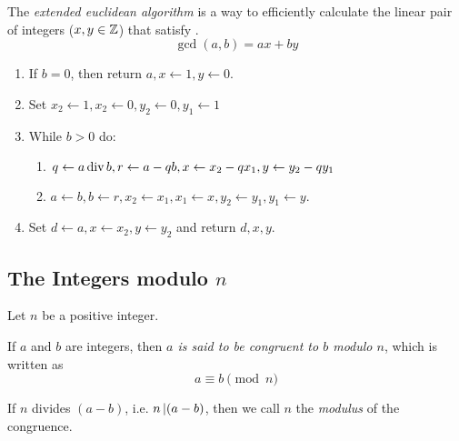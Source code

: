 \begin{definition}\label{def:Extended_Euclidean_Algorithm}
  The \emph{extended euclidean algorithm} is a way to efficiently calculate the linear pair of integers ($x, y \in \operatorname{\mathbb{Z}}$) that satisfy .
  \begin{equation*}
    \gcd(a, b) = ax + by
  \end{equation*}

  \begin{enumerate}[noitemsep]
  \item If $b = 0$, then return $a, x \leftarrow 1, y \leftarrow 0$.
  \item Set $x_{2} \leftarrow 1, x_{2} \leftarrow 0, y_{2} \leftarrow 0, y_{1} \leftarrow 1$
  \item While $b > 0$ do:
    \begin{enumerate}[noitemsep]
    \item $q \leftarrow a \operatorname{\text{div}} b, r \leftarrow a-qb, x \leftarrow x_{2} - qx_{1}, y \leftarrow y_{2} - qy_{1}$
    \item $a \leftarrow b, b \leftarrow r, x_{2} \leftarrow x_{1}, x_{1} \leftarrow x, y_{2} \leftarrow y_{1}, y_{1} \leftarrow y$.
    \end{enumerate}
  \item Set $d \leftarrow a, x \leftarrow x_{2}, y \leftarrow y_{2}$ and return $d, x, y$.
  \end{enumerate}
\end{definition}

\subsection{\texorpdfstring{The Integers modulo $n$}{The Integers modulo n}}\label{subsec:Integer_Modulo_n}
Let $n$ be a positive integer.
\begin{definition}[Congruence]\label{def:Congruence}
  If $a$ and $b$ are integers, then \emph{$a$ is said to be congruent to $b$ modulo $n$}, which is written as
  \begin{equation}\label{eq:A_Congruent_B}
    a \equiv b \pmod{n}
  \end{equation}

  If $n$ divides $(a-b)$, i.e. $n \operatorname{\vert} (a-b)$, then we call $n$ the \emph{modulus} of the congruence.

\end{definition}

